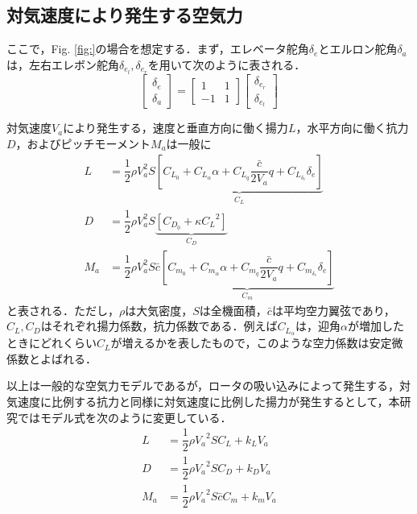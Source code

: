\subsection{対気速度により発生する空気力}

ここで，Fig. \ref{fig:}の場合を想定する．まず，エレベータ舵角$\delta_e$とエルロン舵角$\delta_a$は，左右エレボン舵角$\delta_{e_l}, \delta_{e_r}$を用いて次のように表される．
\begin{equation}
  \left[
    \begin{array}{ccc}
      \delta_e \\
      \delta_a
    \end{array}
  \right] =
  \left[
    \begin{array}{ccc}
      1 & 1 \\
      -1 & 1
    \end{array}
  \right]
  \left[
    \begin{array}{ccc}
      \delta_{e_r} \\
      \delta_{e_l}
    \end{array}
  \right]
\end{equation}

対気速度$V_a$により発生する，速度と垂直方向に働く揚力$L$，水平方向に働く抗力$D$，およびピッチモーメント$M_a$は一般に
\begin{align}
  L &= \dfrac{1}{2}\rho V_a^2 S \underbrace{\left[ C_{L_0}
  +C_{L_\alpha}\alpha+C_{L_q}\dfrac{\bar{c}}{2V_a}q+C_{L_{\delta_e}}\delta_e \right]}_{C_L} \\
  D &= \dfrac{1}{2}\rho V_a^2 S \underbrace{\left[ C_{D_0}+\kappa {C_L}^2 \right]}_{C_D} \\
  M_a &= \dfrac{1}{2}\rho V_a^2 S \bar{c} \underbrace{\left[ C_{m_0}
  +C_{m_\alpha}\alpha+C_{m_q}\dfrac{\bar{c}}{2V_a}q+C_{m_{\delta_e}}\delta_e \right]}_{C_m}
\end{align}
と表される．ただし，$\rho$は大気密度，$S$は全機面積，$\bar{c}$は平均空力翼弦であり，$C_L,C_D$はそれぞれ揚力係数，抗力係数である．例えば$C_{L_\alpha}$は，迎角$\alpha$が増加したときにどれくらい$C_L$が増えるかを表したもので，このような空力係数は安定微係数とよばれる．

以上は一般的な空気力モデルであるが，ロータの吸い込みによって発生する，対気速度に比例する抗力\cite{}と同様に対気速度に比例した揚力が発生するとして，本研究ではモデル式を次のように変更している\cite{}．
\begin{align}
  L &= \dfrac{1}{2}\rho {V_a}^2 S C_L + k_L V_a \\
  D &= \dfrac{1}{2}\rho {V_a}^2 S C_D + k_D V_a \\
  M_a &= \dfrac{1}{2}\rho {V_a}^2 S \bar{c} C_m + k_m V_a
\end{align}

